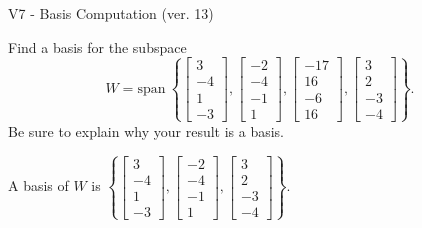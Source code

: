 \begin{exercise}
  \begin{exerciseTitle}V7 - Basis Computation (ver. 13)\end{exerciseTitle}
  \begin{exerciseStatement}
    Find a basis for the subspace 
\[W=\mathrm{span}\ \left\{\left[\begin{array}{r}
3 \\
-4 \\
1 \\
-3
\end{array}\right] , \left[\begin{array}{r}
-2 \\
-4 \\
-1 \\
1
\end{array}\right] , \left[\begin{array}{r}
-17 \\
16 \\
-6 \\
16
\end{array}\right] , \left[\begin{array}{r}
3 \\
2 \\
-3 \\
-4
\end{array}\right]\right\}.\]
 Be sure to explain why your result is a basis.


  \end{exerciseStatement}
  \begin{exerciseAnswer}
   A basis of \(W\) is  \(\left\{\left[\begin{array}{r}
3 \\
-4 \\
1 \\
-3
\end{array}\right] , \left[\begin{array}{r}
-2 \\
-4 \\
-1 \\
1
\end{array}\right] , \left[\begin{array}{r}
3 \\
2 \\
-3 \\
-4
\end{array}\right]\right\}\).
  


  \end{exerciseAnswer}
\end{exercise}